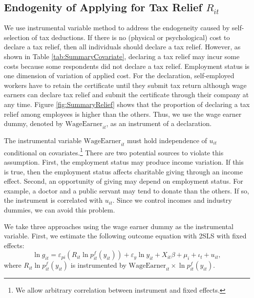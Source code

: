 \documentclass[
  11pt,
  a4paper,
]{article}
\begin{document}
\hypertarget{endogenity-of-applying-for-tax-relief-r_it}{%
\subsection{\texorpdfstring{Endogenity of Applying for Tax Relief \(R_{it}\)}{Endogenity of Applying for Tax Relief R\_\{it\}}}\label{endogenity-of-applying-for-tax-relief-r_it}}

We use instrumental variable method to address the endogeneity caused by self-selection of tax deductions.
If there is no (physical or psychological) cost to declare a tax relief,
then all individuals should declare a tax relief.
However, as shown in Table \ref{tab:SummaryCovariate},
declaring a tax relief may incur some costs because some respondents did not declare a tax relief.
Employment status is one dimension of variation of applied cost.
For the declaration, self-employed workers have to retain the certificate until they submit tax return although wage earners can declare tax relief and submit the certificate through their company at any time.
Figure \ref{fig:SummaryRelief} shows that
the proportion of declaring a tax relief among employees is higher than the others.
Thus, we use the wage earner dummy, denoted by \(\text{WageEarner}_{it}\), as an instrument of a declaration.

The instrumental variable \(\text{WageEarner}_{it}\) must hold independence of \(u_{it}\) conditional on covariates.\footnote{We allow arbitrary correlation between instrument and fixed effects.}
There are two potential sources to violate this assumption.
First, the employment status may produce income variation.
If this is true, then the employment status affects charitable giving through an income effect.
Second, an opportunity of giving may depend on employment status.
For example, a doctor and a public servant may tend to donate than the others.
If so, the instrument is correlated with \(u_{it}\).
Since we control incomes and industry dummies, we can avoid this problem.

We take three approaches using the wage earner dummy as the instrumental variable.
First, we estimate the following outcome equation with 2SLS with fixed effects:
\begin{equation}
    \ln g_{it} = \varepsilon_{pi} (R_{it} \ln p^f_{it}(y_{it})) + \varepsilon_y \ln y_{it} 
    + X_{it}\beta +\mu_i +\iota_t +u_{it}, \label{eq:stage2}
\end{equation}
where \(R_{it} \ln p^f_{it}(y_{it})\) is instrumented by
\(\text{WageEarner}_{it} \times \ln p^f_{it}(y_{it})\).
\end{document}
